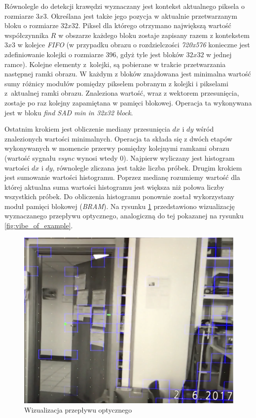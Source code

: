 Równolegle do detekcji krawędzi wyznaczany jest kontekst aktualnego piksela o rozmiarze $3x3$. 
Określana jest także jego pozycja w aktualnie przetwarzanym bloku o rozmiarze $32x32$. 
Piksel dla którego otrzymano największą wartość współczynnika $R$ w obszarze każdego bloku zostaje zapisany razem z kontekstem $3x3$ w kolejce \textit{FIFO} (w przypadku obrazu o rozdzielczości \textit{720x576} konieczne jest zdefiniowanie kolejki o rozmiarze 396, gdyż tyle jest bloków $32x32$ w jednej ramce). 
Kolejne elementy z~kolejki, są pobierane w trakcie przetwarzania następnej ramki obrazu. 
W każdym z bloków znajdowana jest minimalna wartość sumy różnicy modułów pomiędzy pikselem pobranym z kolejki i pikselami z~aktualnej ramki obrazu. Znaleziona wartość, wraz z wektorem przesunięcia, zostaje po raz kolejny zapamiętana w pamięci blokowej. Operacja ta wykonywana jest w bloku \textit{find SAD min in 32x32 block}.


Ostatnim krokiem jest obliczenie mediany przesunięcia $dx$ i $dy$ wśród znalezionych wartości minimalnych. 
Operacja ta składa się z dwóch etapów wykonywanych w momencie przerwy pomiędzy kolejnymi ramkami obrazu (wartość sygnału \textit{vsync} wynosi wtedy $0$). 
Najpierw wyliczany jest histogram wartości $dx$ i $dy$, równolegle zliczana jest także liczba próbek. 
Drugim krokiem jest sumowanie wartości histogramu. 
Poprzez medianę rozumiemy wartość dla której aktualna suma wartości histogramu jest większa niż połowa liczby wszystkich próbek. 
Do obliczenia histogramu ponownie został wykorzystany moduł pamięci blokowej (\textit{BRAM}). 
Na rysunku \ref{fig:vibe_plus_demo} przedstawiono wizualizację wyznaczanego przepływu optycznego, analogiczną do tej pokazanej na rysunku \ref{fig:vibe_of_example}.

	\begin{figure}[h!]
		\centering
		\includegraphics[scale=0.3]{img/4/vibe_plus_example_2.png}
		\caption{Wizualizacja przepływu optycznego} %
		\label{fig:vibe_plus_demo}
	\end{figure}
	

